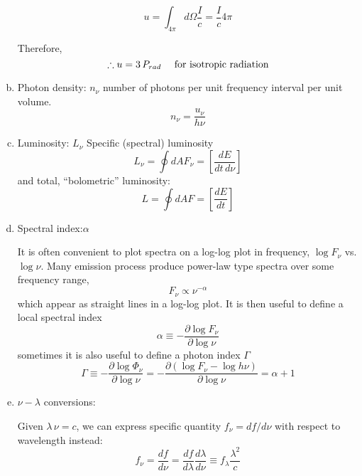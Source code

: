 \begin{enumerate}[a)]
\begin{equation}
   u = \int_{4\pi} d\Omega \frac{I}{c} = \frac{I}{c}4\pi
\end{equation}

Therefore,
\begin{equation}
   \therefore u=3\,P_{rad} ~~~~\rm for~isotropic~radiation
\end{equation}

   \item Photon density: $n_{\nu}$
number of photons per unit frequency interval per unit volume. 
\begin{equation} 
   n_{\nu} = \frac{u_{\nu}}{h\nu}
\end{equation}
   \item Luminosity: $L_{\nu}$
Specific (spectral) luminosity
\begin{equation}
  L_{\nu} = \oint dA F_{\nu} = \left[ \frac{dE}{dt\,d\nu}\right]
\end{equation}
and total, ``bolometric'' luminosity:
\begin{equation}
  L = \oint dA F = \left[ \frac{dE}{dt}\right]
\end{equation}
   \item Spectral index:$\alpha$

It is often convenient to plot spectra on a log-log plot in frequency, $\log F_{\nu}$ vs. $\log \nu$.
Many emission process produce power-law type spectra over some frequency range,
\begin{equation}
   F_{\nu} \propto \nu^{-\alpha}
\end{equation}
which appear as straight lines in a log-log plot. It is then useful to define a local spectral index
\begin{equation}
   \alpha \equiv -\frac{\partial \log{F_{\nu}}}{\partial \log{\nu}}
\end{equation}
sometimes it is also useful to define a photon index $\Gamma$
\begin{equation}
   \Gamma \equiv -\frac{\partial \log{\Phi_{\nu}}}{\partial \log{\nu}} = -\frac{\partial \left( \log{F_{\nu}} - \log{h\nu} \right)}{\partial \log{\nu}} = \alpha +1 
\end{equation}

   \item $\nu - \lambda$ conversions:
 
Given $\lambda\,\nu = c$, we can express specific quantity $f_{\nu} = df/d\nu$ with respect to wavelength instead:
\begin{equation}
   f_{\nu} = \frac{df}{d\nu} = \frac{df}{d\lambda}\frac{d\lambda}{d\nu} \equiv f_{\lambda}\frac{\lambda^2}{c}
\end{equation}

\end{enumerate}

